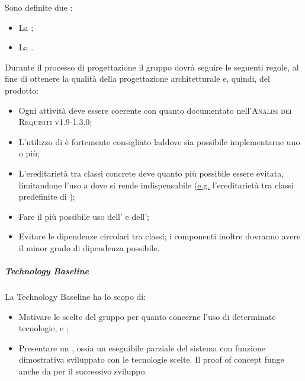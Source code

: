\documentclass[../norme-di-progetto.tex]{subfiles}
\begin{document}
Sono definite due :
\begin{itemize}
  \item La \textbf{};
  \item La \textbf{}.
\end{itemize}

Durante il processo di progettazione il gruppo dovrà seguire le seguenti regole, al fine di ottenere la qualità della progettazione architetturale e, quindi, del prodotto:
\begin{itemize}
  \item Ogni attività deve essere coerente con quanto documentato nell'\textsc{Analisi dei Requisiti v1.9-1.3.0};
  \item L'utilizzo di  è fortemente consigliato laddove sia possibile implementarne uno o più;
  \item L'ereditarietà tra classi concrete deve quanto più possibile essere evitata, limitandone l'uso a dove si rende indispensabile (\underline{e.g.} l'ereditarietà tra classi predefinite di );
  \item Fare il più possibile uso dell' e dell';
  \item Evitare le dipendenze circolari tra classi; i componenti inoltre dovranno avere il minor grado di dipendenza possibile.
\end{itemize}

\subparagraph*{Technology Baseline}
La Technology Baseline ha lo scopo di:
\begin{itemize}
  \item Motivare le scelte del gruppo per quanto concerne l'uso di determinate tecnologie,  e ;
  \item Presentare un , ossia un eseguibile parziale del sistema con funzione dimostrativa sviluppato con le tecnologie scelte. Il proof of concept funge anche da  per il successivo sviluppo.
\end{itemize}
\end{document}
